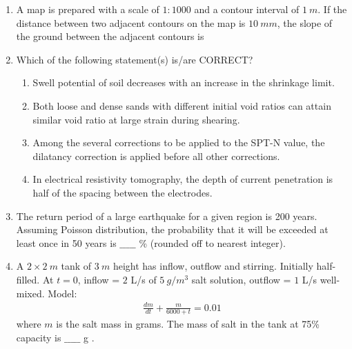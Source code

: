 \documentclass[journal]{IEEEtran}
\begin{document}
\begin{enumerate}
\item A map is prepared with a scale of $1:1000$ and a contour interval of $1 \ m$. If the distance between two adjacent contours on the map is $10 \ mm$, the slope of the ground between the adjacent contours is  
\hfill {}  
\begin{enumerate}
\end{enumerate}

\item Which of the following statement(s) is/are CORRECT?  
\hfill {}  
\begin{enumerate}
\item Swell potential of soil decreases with an increase in the shrinkage limit.  
\item Both loose and dense sands with different initial void ratios can attain similar void ratio at large strain during shearing.  
\item Among the several corrections to be applied to the SPT-N value, the dilatancy correction is applied before all other corrections.  
\item In electrical resistivity tomography, the depth of current penetration is half of the spacing between the electrodes.  
\end{enumerate}

\item The return period of a large earthquake for a given region is 200 years. Assuming Poisson distribution, the probability that it will be exceeded at least once in 50 years is $\_\_\_\_\_$ \% (rounded off to nearest integer).  
\hfill {}  

\item A $2 \times 2 \ m$ tank of $3 \ m$ height has inflow, outflow and stirring. Initially half-filled. At $t=0$, inflow = $2$ L/s of $5 \ g/m^3$ salt solution, outflow = $1$ L/s well-mixed. Model:  
\begin{align}
\frac{dm}{dt} + \frac{m}{6000+t} = 0.01
\end{align}
where $m$ is the salt mass in grams. The mass of salt in the tank at 75\% capacity is $\_\_\_\_\_$ g .  
\hfill {}  


\end{enumerate}
\end{document}
